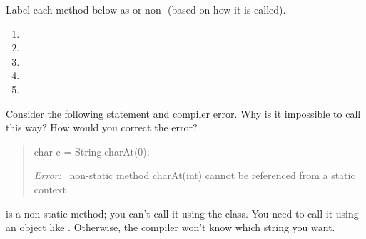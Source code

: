 \Q \label{nonstatic}
Label each method below as  or non- (based on how it is called).

\begin{multicols}{2}
\begin{enumerate}

\item {}

\item {}

\item {}

\item {}

\item {}

\end{enumerate}
\end{multicols}


\Q Consider the following statement and compiler error.
Why is it impossible to call  this way?
How would you correct the error?

\begin{quote}
\begin{javalst}
char c = String.charAt(0);
\end{javalst}
\textit{Error:~} non-static method charAt(int) cannot be referenced from a static context
\end{quote}

\begin{answer}
 is a non-static method; you can't call it using the  class.
You need to call it using an object like .
Otherwise, the compiler won't know which string you want.
\end{answer}


%
%


